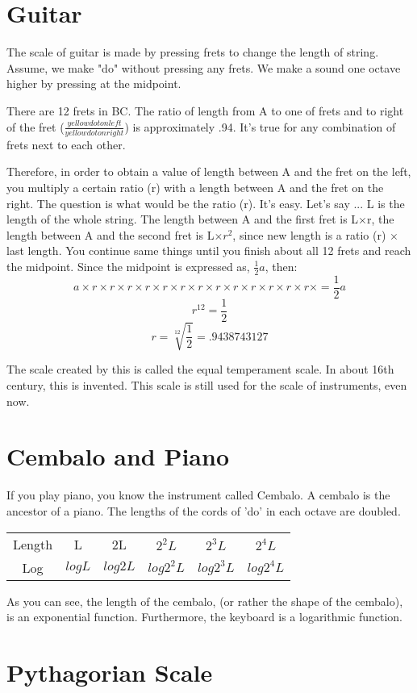 \documentclass{article}
\begin{document}
\section*{Guitar}
The scale of guitar is made by pressing frets to change the length of string. Assume, we make "do" without pressing any frets. We make a sound one octave higher by pressing at the midpoint.


There are 12 frets in BC. The ratio of length from A to one of frets and to right of the fret ($\frac{yellow dot on left}{yellow dot on right}$) is approximately .94. It's true for any combination of frets next to each other.

Therefore, in order to obtain a value of length between A and the fret on the left, you multiply a certain ratio (r) with a length between A and the fret on the right. The question is what would be the ratio (r). It's easy. Let's say ... L is the length of the whole string. The length between A and the first fret is L$\times$r, the length between A and the second fret is L$\times r^2$, since new length is a ratio (r) $\times$ last length. You continue same things until you finish about all 12 frets and reach the midpoint. Since the midpoint is expressed as, $\frac{1}{2}a$, then:
\[a\times r\times r\times r\times r\times r\times r\times r\times r\times r\times r\times r\times r\times r\times = \frac{1}{2}a\]
\[r^{12} = \frac{1}{2}\]
\[r = \sqrt[12]{\frac{1}{2}} = .9438743127\]

The scale created by this is called the equal temperament scale. In about 16th century, this is invented. This scale is still used for the scale of instruments, even now. 

\pagebreak

\section*{Cembalo and Piano}
If you play piano, you know the instrument called Cembalo. A cembalo is the ancestor of a piano. The lengths of the cords of 'do' in each octave are doubled. 
\begin{table}
\begin{center}
\begin{tabular}{|c|c|c|c|c|c|}
Length & L & 2L & $2^2L$ & $2^3L$ & $2^4L$\\
Log & $log L$ & $log 2L$ & $log 2^2L$ & $log 2^3L$ & $log 2^4L$\\
\end{tabular}
\end{center}
\end{table}

As you can see, the length of the cembalo, (or rather the shape of the cembalo), is an exponential function. Furthermore, the keyboard is a logarithmic function. 
\pagebreak

\section*{Pythagorian Scale}
\end{document}
